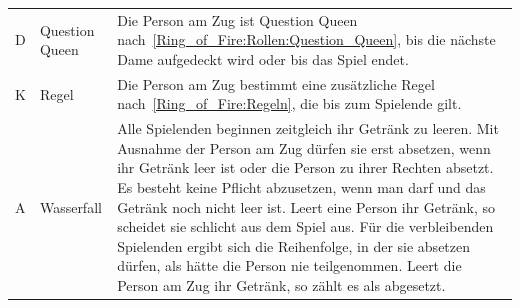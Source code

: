 \begin{enumerate}[label={(\arabic*)}]
\begin{longtable}[r]{p{}  p{}  p{}}
		D  & Question Queen & Die Person am Zug ist Question Queen nach~\ref{Ring_of_Fire:Rollen:Question_Queen}, bis die nächste Dame aufgedeckt wird oder bis das Spiel endet.\\
		K  & Regel          & Die Person am Zug bestimmt eine zusätzliche Regel nach~\ref{Ring_of_Fire:Regeln}, die bis zum Spielende gilt.\\
		A  & Wasserfall     & Alle Spielenden beginnen zeitgleich ihr Getränk zu leeren.
		Mit Ausnahme der Person am Zug dürfen sie erst absetzen, wenn ihr Getränk leer ist oder die Person zu ihrer Rechten absetzt.
		Es besteht keine Pflicht abzusetzen, wenn man darf und das Getränk noch nicht leer ist.
		Leert eine Person ihr Getränk, so scheidet sie schlicht aus dem Spiel aus.
		Für die verbleibenden Spielenden ergibt sich die Reihenfolge, in der sie absetzen dürfen, als hätte die Person nie teilgenommen.
		Leert die Person am Zug ihr Getränk, so zählt es als abgesetzt.\\
		\bottomrule
	\end{longtable}
\end{enumerate}

